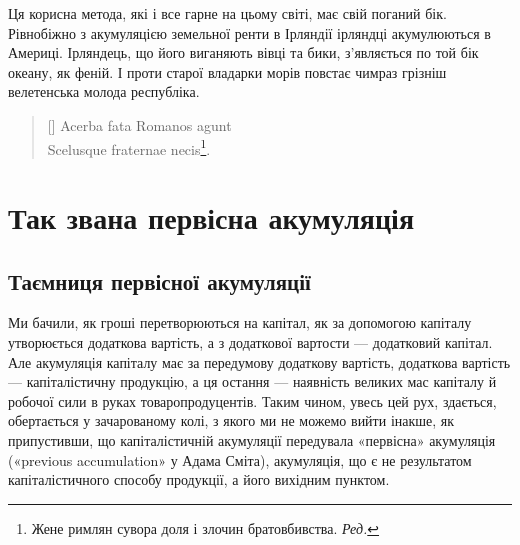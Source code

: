 Ця корисна метода, які і все гарне на цьому світі, має свій
поганий бік. Рівнобіжно з акумуляцією земельної ренти в Ірляндії
ірляндці акумулюються в Америці. Ірляндець, що його виганяють
вівці та бики, з’являється по той бік океану, як феній.
І проти старої владарки морів повстає чимраз грізніш велетенська
молода республіка.

\settowidth{\versewidth}{Scelusque fraternae necis.}
\begin{verse}[\versewidth]
Acerba fata Romanos agunt \\
Scelusque fraternae necis\footnote*{
Жене римлян сувора доля і злочин братовбивства. \emph{Ред.}
}.
\end{verse}

\section{Так звана первісна акумуляція}

\subsection{Таємниця первісної акумуляції}

Ми бачили, як гроші перетворюються на капітал, як за допомогою
капіталу утворюється додаткова вартість, а з додаткової
вартости — додатковий капітал. Але акумуляція капіталу має за
передумову додаткову вартість, додаткова вартість — капіталістичну
продукцію, а ця остання — наявність великих мас капіталу
й робочої сили в руках товаропродуцентів. Таким чином,
увесь цей рух, здається, обертається у зачарованому колі, з
якого ми не можемо вийти інакше, як припустивши, що капіталістичній
акумуляції передувала «первісна» акумуляція («previous
accumulation» у Адама Сміта), акумуляція, що є не результатом
капіталістичного способу продукції, а його вихідним пунктом.

